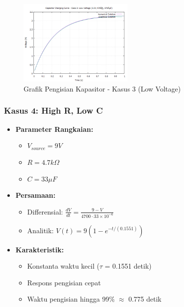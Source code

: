 \documentclass[conference]{IEEEtran}
\begin{document}
\begin{figure}[H]
    \centering
    \includegraphics[width=0.5\textwidth]{Grafik/Grafik3.png}
    \caption{Grafik Pengisian Kapasitor - Kasus 3 (Low Voltage)}
    \label{fig:case3}
\end{figure}

\subsubsection{Kasus 4: High R, Low C}
\begin{itemize}
\item \textbf{Parameter Rangkaian:}
  \begin{itemize}
  \item $V_{source} = 9V$
  \item $R = 4.7k\Omega$
  \item $C = 33\mu F$
  \end{itemize}
\item \textbf{Persamaan:}
  \begin{itemize}
  \item Differensial: $\frac{dV}{dt} = \frac{9 - V}{4700 \cdot 33\times10^{-6}}$
  \item Analitik: $V(t) = 9(1 - e^{-t/(0.1551)})$
  \end{itemize}
\item \textbf{Karakteristik:}
  \begin{itemize}
  \item Konstanta waktu kecil ($\tau$ = 0.1551 detik)
  \item Respons pengisian cepat
  \item Waktu pengisian hingga 99\% $\approx$ 0.775 detik
  \end{itemize}
\end{itemize}
\end{document}
